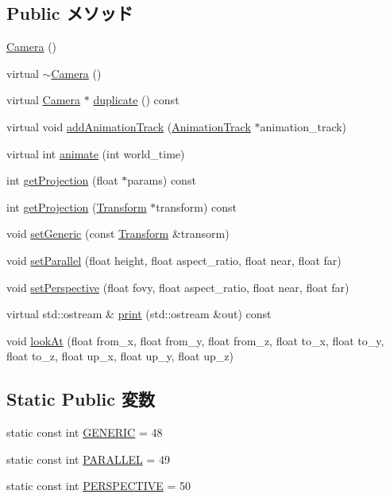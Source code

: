 \subsection*{Public メソッド}
\begin{CompactItemize}
\item 
\hyperlink{classm3g_1_1Camera_a3f3efcb2fcc75de885df29041103cd2}{Camera} ()
\item 
virtual \hyperlink{classm3g_1_1Camera_b921e886e6f14e117eb8099ccb0a3775}{$\sim$Camera} ()
\item 
virtual \hyperlink{classm3g_1_1Camera}{Camera} $\ast$ \hyperlink{classm3g_1_1Camera_6279f7f8ab52af683fadd193d7694f2d}{duplicate} () const 
\item 
virtual void \hyperlink{classm3g_1_1Camera_415c0b110f95410ded9b85e5d99a496b}{addAnimationTrack} (\hyperlink{classm3g_1_1AnimationTrack}{AnimationTrack} $\ast$animation\_\-track)
\item 
virtual int \hyperlink{classm3g_1_1Camera_8aad1ceab4c2a03609c8a42324ce484d}{animate} (int world\_\-time)
\item 
int \hyperlink{classm3g_1_1Camera_a2ebe46a4e16fee86d4f547588411302}{getProjection} (float $\ast$params) const 
\item 
int \hyperlink{classm3g_1_1Camera_9e0c204df146342990703acb744954b1}{getProjection} (\hyperlink{classm3g_1_1Transform}{Transform} $\ast$transform) const 
\item 
void \hyperlink{classm3g_1_1Camera_51c42821097e90d3f59e87676684f60a}{setGeneric} (const \hyperlink{classm3g_1_1Transform}{Transform} \&transorm)
\item 
void \hyperlink{classm3g_1_1Camera_cb4535fd75b28b4d58390962d0c0e588}{setParallel} (float height, float aspect\_\-ratio, float near, float far)
\item 
void \hyperlink{classm3g_1_1Camera_ca92a48ebe3424deac8e54c27550189d}{setPerspective} (float fovy, float aspect\_\-ratio, float near, float far)
\item 
virtual std::ostream \& \hyperlink{classm3g_1_1Camera_6fea17fa1532df3794f8cb39cb4f911f}{print} (std::ostream \&out) const 
\item 
void \hyperlink{classm3g_1_1Camera_0006b18ae0e27a031d533e987b9756a8}{lookAt} (float from\_\-x, float from\_\-y, float from\_\-z, float to\_\-x, float to\_\-y, float to\_\-z, float up\_\-x, float up\_\-y, float up\_\-z)
\end{CompactItemize}
\subsection*{Static Public 変数}
\begin{CompactItemize}
\item 
static const int \hyperlink{classm3g_1_1Camera_48a4e153c97a1f4890558a77dfe02ca4}{GENERIC} = 48
\item 
static const int \hyperlink{classm3g_1_1Camera_d9630da0e9505afbb107c86229aa2f08}{PARALLEL} = 49
\item 
static const int \hyperlink{classm3g_1_1Camera_e62e72bde93e7d7ceb482e7a8c40dcf5}{PERSPECTIVE} = 50
\end{CompactItemize}
